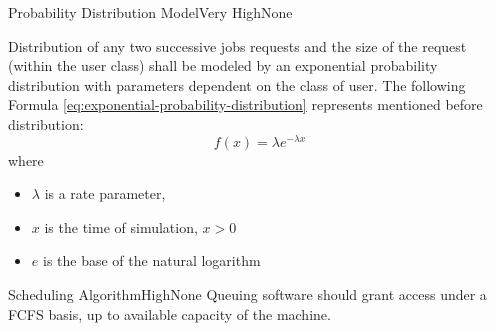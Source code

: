 	\begin{functional}{Probability Distribution Model}{Very High}{None}
		\label{fn:simulation-feature:distribution-of-jobs}
		{
			Distribution of any two successive jobs requests and the size of the request (within the user class) shall be modeled by an exponential probability distribution with parameters dependent on the class of user. The following Formula \eqref{eq:exponential-probability-distribution} represents mentioned before distribution:
			\begin{equation} \label{eq:exponential-probability-distribution}
				f(x) = \lambda e^{-\lambda x}
			\end{equation}
			where 
			\begin{itemize}
				\item $\lambda$ is a rate parameter,
				\item $x$ is the time of simulation, $x > 0$
				\item $e$ is the base of the natural logarithm
			\end{itemize}
		}
	\end{functional}

	\begin{functional}{Scheduling Algorithm}{High}{None}
		\label{fn:simulation-feature:scheduling-algorithm}
		{
			Queuing software should grant access under a \gls{FCFS} basis, up to available capacity of the machine.
		}
	\end{functional}

